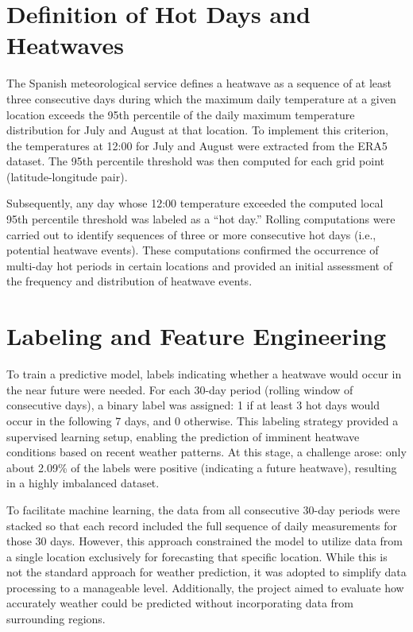 \documentclass[8pt,a4paper]{article}
\begin{document}
\section{Definition of Hot Days and Heatwaves}
\label{heatDef}
The Spanish meteorological service defines a heatwave as a sequence of at least three consecutive days during which the maximum daily temperature at a given location exceeds the 95th percentile of the daily maximum temperature distribution for July and August at that location. To implement this criterion, the temperatures at 12:00 for July and August were extracted from the ERA5 dataset. The 95th percentile threshold was then computed for each grid point (latitude-longitude pair).

Subsequently, any day whose 12:00 temperature exceeded the computed local 95th percentile threshold was labeled as a ``hot day.'' Rolling computations were carried out to identify sequences of three or more consecutive hot days (i.e., potential heatwave events). These computations confirmed the occurrence of multi-day hot periods in certain locations and provided an initial assessment of the frequency and distribution of heatwave events.

\section{Labeling and Feature Engineering}
To train a predictive model, labels indicating whether a heatwave would occur in the near future were needed. For each 30-day period (rolling window of consecutive days), a binary label was assigned: 1 if at least 3 hot days would occur in the following 7 days, and 0 otherwise. This labeling strategy provided a supervised learning setup, enabling the prediction of imminent heatwave conditions based on recent weather patterns. At this stage, a challenge arose: only about 2.09\% of the labels were positive (indicating a future heatwave), resulting in a highly imbalanced dataset. 

To facilitate machine learning, the data from all consecutive 30-day periods were stacked so that each record included the full sequence of daily measurements for those 30 days. However, this approach constrained the model to utilize data from a single location exclusively for forecasting that specific location. While this is not the standard approach for weather prediction, it was adopted to simplify data processing to a manageable level. Additionally, the project aimed to evaluate how accurately weather could be predicted without incorporating data from surrounding regions.
\end{document}
